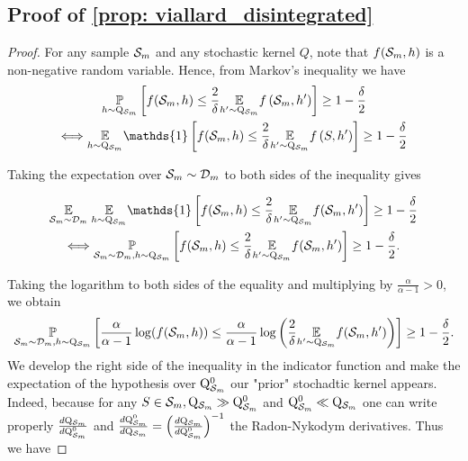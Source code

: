\begin{noaddcontents}
\subsection{Proof of \cref{prop: viallard_disintegrated} }


\begin{proof}
 For any sample $\mathcal{S}_m$ and any stochastic kernel $Q$, note that $f(\mathcal{S}_m,h)$ is a non-negative random variable. Hence, from Markov's inequality we have
\begin{multline*}
    \underset{h \sim \Q_{\Sm}}{\mathbb{P}}\left[f(\Sm,h) \leq \frac{2}{\delta} \underset{h^{\prime} \sim \Q_{\Sm}}{\mathbb{E}} f\left( \Sm,h^{\prime}\right)\right] \geq 1-\frac{\delta}{2} \\
    \Longleftrightarrow
    \underset{h \sim \Q_{\Sm}}{\mathbb{E}} \mathds{1}\left[f(\Sm,h) \leq \frac{2}{\delta} \underset{h^{\prime} \sim \Q_{\Sm}}{\mathbb{E}} f\left(S,h'\right)\right] \geq 1-\frac{\delta}{2}
\end{multline*}


Taking the expectation over $\mathcal{S}_m \sim \mathcal{D}_{m}$ to both sides of the inequality gives

\begin{multline*}
\underset{\Sm \sim \Dm}{\mathbb{E}}\; \underset{h \sim \Q_{\Sm}}{\mathbb{E}} \mathds{1}\left[f(\Sm,h) \leq \frac{2}{\delta} \underset{h^{\prime} \sim \Q_{\Sm}}{\mathbb{E}} f(\Sm,h')\right] \geq 1-\frac{\delta}{2} \\
\Longleftrightarrow
\underset{\Sm \sim \Dm, h \sim \Q_{\Sm}}{\mathbb{P}}\left[f(\Sm,h) \leq \frac{2}{\delta} \underset{h^{\prime} \sim \Q_{\Sm}}{\mathbb{E}} f(\Sm,h')\right] \geq 1-\frac{\delta}{2}.
\end{multline*}

Taking the logarithm to both sides of the equality and multiplying by $\frac{\alpha}{\alpha-1}>0$, we obtain
$$
\underset{\mathcal{S}_m \sim \mathcal{D}_{m}, h \sim \mathrm{Q}_{\mathcal{S}_m}}{\mathbb{P}}\left[\frac{\alpha}{\alpha-1} \log (f(\mathcal{S}_m,h)) \leq \frac{\alpha}{\alpha-1} \log \left(\frac{2}{\delta} \underset{h^{\prime} \sim \mathrm{Q}_{\mathcal{S}_m}}{\mathbb{E}} f(\mathcal{S}_m,h')\right)\right] \geq 1-\frac{\delta}{2} .
$$
We develop the right side of the inequality in the indicator function and make the expectation of the hypothesis over $\mathrm{Q}_{\mathcal{S}_m}^0$ our "prior" stochadtic kernel appears. Indeed, because for any $S\in\mathcal{S}_m, \mathrm{Q}_{\mathcal{S}_m}\gg\mathrm{Q}_{\mathcal{S}_m}^0$ and $\mathrm{Q}_{\mathcal{S}_m}^0\ll \mathrm{Q}_{\mathcal{S}_m}$ one can write properly $\frac{d\mathrm{Q}_{\mathcal{S}_m}}{d\mathrm{Q}_{\mathcal{S}_m}^0}$ and $ \frac{d\mathrm{Q}_{\mathcal{S}_m}^0}{d\mathrm{Q}_{\mathcal{S}_m}} = \left( \frac{d\mathrm{Q}_{\mathcal{S}_m}}{d\mathrm{Q}_{\mathcal{S}_m}^0}\right)^{-1}$ the Radon-Nykodym derivatives. Thus we have


\end{proof}
\end{noaddcontents}
